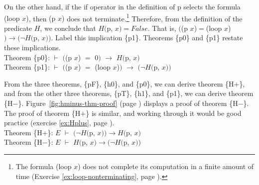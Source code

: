 On the other hand, if the \textsf{if} operator in the definition of \textsf{p}
selects the formula \textsf{(loop $x$)}, then \textsf{(p $x$)}
does not terminate.\footnote{The formula \textsf{(loop $x$)} does not complete its
computation in a finite amount of time
(Exercise \ref{ex:loop-nonterminating}, page \pageref{ex:loop-nonterminating}).}
Therefore, from the definition of the predicate $H$,
we conclude that $H($\textsf{p}, $x)=False$.
That is, $($\textsf{(\textsf{p} $x$)}$=$\textsf{(loop $x$)}$)\rightarrow(\neg H($\textsf{p}, $x))$.
Label this implication \{p1\}.
Theorems \{p0\} and \{p1\} restate these implications.
\vspace{2mm}\\
\hspace*{5mm}Theorem \{p0\}: $\vdash$  $($\textsf{(p $x$)} $=$ \textsf{0}$)$ $\rightarrow$ $H($\textsf{p}, $x)$ \\
\hspace*{5mm}Theorem \{p1\}: $\vdash$  $($\textsf{(p $x$)} $=$ \textsf{(loop $x$)}$)$ $\rightarrow$ $(\neg H($\textsf{p}, $x))$
\vspace{2mm}

From the three theorems, \{pF\}, \{h0\}, and \{p0\},
we can derive theorem \{H$+$\}, and
from the other three theorems, \{pT\}, \{h1\}, and \{p1\},
we can derive
theorem \{H$-$\}.
Figure~\ref{fig:hminus-thm-proof} (page \pageref{fig:hminus-thm-proof}) displays
a proof of theorem \{H$-$\}.
The proof of theorem \{H$+$\} is similar, and working through it would be
good practice (exercise \ref{ex:Hplus}, page \pageref{ex:Hplus}).
\vspace{2mm}\\
\hspace*{5mm}Theorem \{H$+$\}: $E$ $\vdash$ $(\neg H($\textsf{p}, $x)) \rightarrow H($\textsf{p}, $x)$ \\
\hspace*{5mm}Theorem \{H$-$\}: $E$ $\vdash$ $H($\textsf{p}, $x) \rightarrow (\neg H($\textsf{p}, $x))$
\vspace{2mm}

